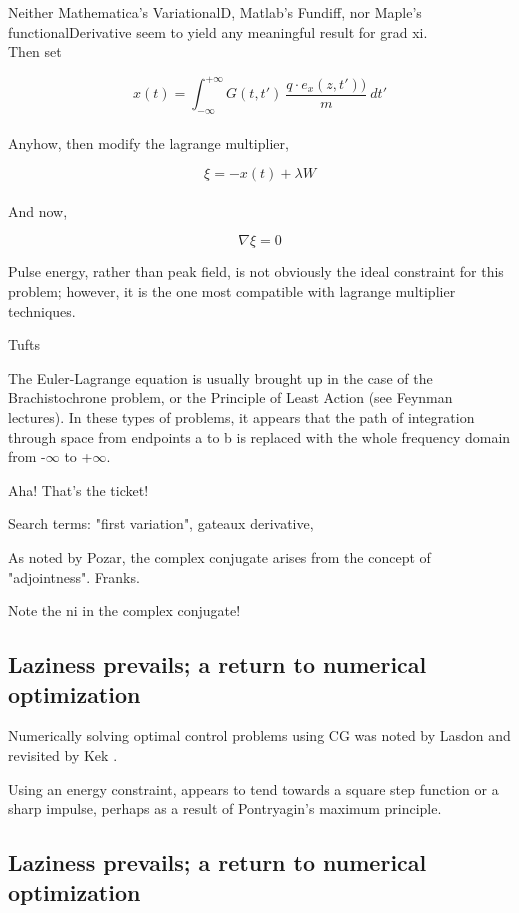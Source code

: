 \documentclass[paper.tex]{subfiles}
\begin{document}
Neither Mathematica's VariationalD, Matlab's Fundiff, nor Maple's functionalDerivative seem to yield any meaningful result for grad xi.\\

Then set

$$x(t) = \int_{-\infty}^{+\infty}{G(t,t')\ \frac{q\cdot e_x(z,t'))}{m}\ } dt'$$\\

Anyhow, then modify the lagrange multiplier,

$$\xi = -x(t) + \lambda W$$\\

And now,

$$\nabla \xi = 0$$





Pulse energy, rather than peak field, is not obviously the ideal constraint for this problem; however, it is the one most compatible with lagrange multiplier techniques.

Tufts \cite{Optimum1964}

The Euler-Lagrange equation is usually brought up in the case of the Brachistochrone problem, or the Principle of Least Action (see Feynman lectures). In these types of problems, it appears that the path of integration through space from endpoints a to b is replaced with the whole frequency domain from -$\infty$ to +$\infty$. 

Aha! That's the ticket! 

Search terms: "first variation", gateaux derivative, 

As noted by Pozar, the complex conjugate arises from the concept of "adjointness". Franks.

Note the ni in the complex conjugate!


\subsection{Laziness prevails; a return to numerical optimization}

Numerically solving optimal control problems using CG was noted by Lasdon \cite{conjugate1967} and revisited by Kek \cite{Conjugate}. 

Using an energy constraint, appears to tend towards a square step function or a sharp impulse, perhaps as a result of Pontryagin's maximum principle\cite{Optimum1964}.



\subsection{Laziness prevails; a return to numerical optimization}
\end{document}
